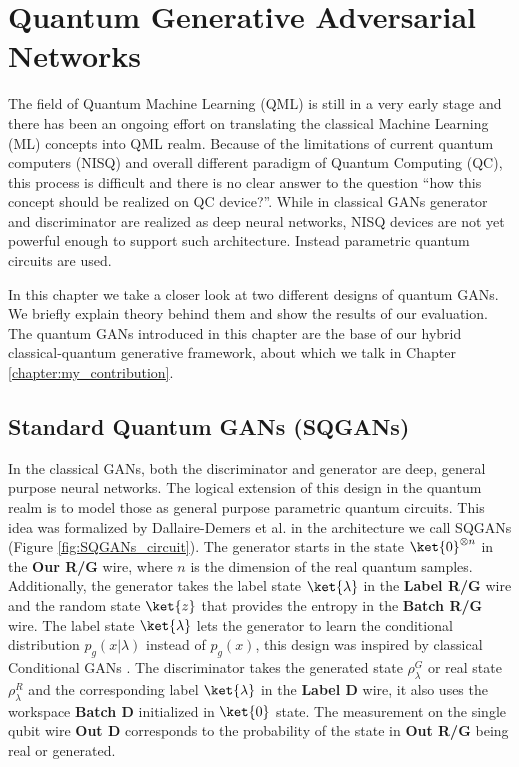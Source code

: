 \chapter{Quantum Generative Adversarial Networks}\label{chapter:quantum_gans}
The field of Quantum Machine Learning (QML) is still in a very early stage and there
has been an ongoing effort on translating the  classical Machine Learning (ML)
concepts into QML realm. Because of the limitations of current quantum computers
(NISQ) \cite{bharti2021noisy} and overall different paradigm of Quantum
Computing (QC), this process is difficult and there is no clear
answer to the question ``how this concept should be realized on QC device?''.
While in classical GANs generator and discriminator are realized as deep neural
networks, NISQ devices are not yet powerful enough to support such architecture.
Instead parametric quantum circuits \cite{Schuld_2020} are used.

In this chapter we take a closer look at two different designs of quantum GANs.
We briefly explain theory behind them and show the results of our evaluation.
The quantum GANs introduced in this chapter are the base of our hybrid
classical-quantum generative framework, about which we talk in Chapter \ref{chapter:my_contribution}.

\section{Standard Quantum GANs (SQGANs)}
In the classical GANs, both the discriminator and generator are deep, general
purpose neural networks. The logical extension of this design in the quantum
realm is to model those as general purpose parametric quantum circuits. This
idea was formalized by Dallaire-Demers et al. \cite{Dallaire_Demers_2018} in
the architecture we call SQGANs (Figure \ref{fig:SQGANs_circuit}). The generator
starts in the state $\ket{0}^{\otimes n}$ in the \textbf{Our R/G} wire, where
$n$ is the dimension of the real quantum samples.
Additionally, the generator takes the label state $\ket{\lambda}$ in the
\textbf{Label R/G} wire and the random state $\ket{z}$ that provides the entropy in
the \textbf{Batch R/G} wire. The label state $\ket{\lambda}$ lets the
generator to learn the conditional distribution $p_g(x|\lambda)$ instead of $p_g(x)$,
this design was inspired by classical Conditional GANs
\cite{mirza2014conditional}. The discriminator takes the generated state
$\rho_\lambda^G$ or real state $\rho_\lambda^R$ and the corresponding label
$\ket{\lambda}$ in the \textbf{Label D} wire, it also uses the workspace
\textbf{Batch D} initialized in $\ket{0}$ state. The measurement on the single
qubit wire \textbf{Out D} corresponds to the probability of the state in 
\textbf{Out R/G} being real or generated.

